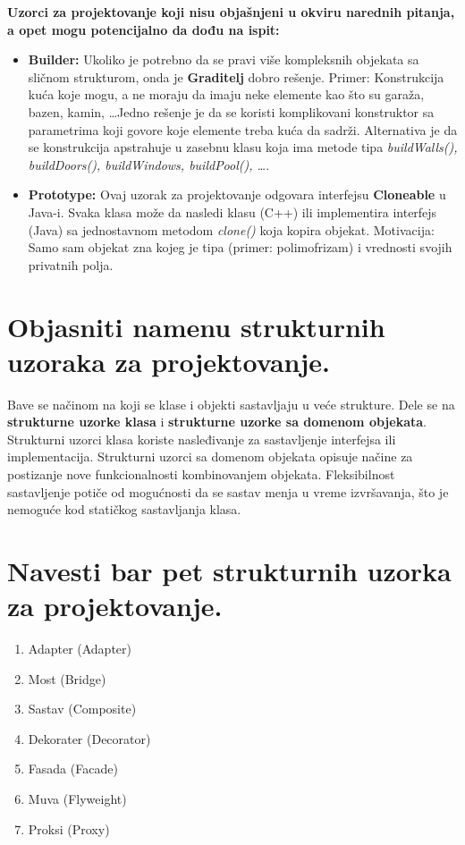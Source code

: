 \documentclass[a4paper]{article}
\begin{document}
  \textbf{Uzorci za projektovanje koji nisu objašnjeni u okviru narednih pitanja, a opet mogu potencijalno da
          dođu na ispit:}
  \begin{itemize}
    \item \textbf{Builder:} Ukoliko je potrebno da se pravi više kompleksnih objekata sa sličnom strukturom, onda je
          \textbf{Graditelj} dobro rešenje. Primer: Konstrukcija kuća koje mogu, a ne moraju da imaju neke elemente
          kao što su garaža, bazen, kamin, \dots Jedno rešenje je da se koristi komplikovani konstruktor sa parametrima
          koji govore koje elemente treba kuća da sadrži. Alternativa je da se konstrukcija apstrahuje u zasebnu klasu
          koja ima metode tipa \textit{buildWalls(), buildDoors(), buildWindows, buildPool(), \dots}.
    \item \textbf{Prototype:} Ovaj uzorak za projektovanje odgovara interfejsu \textbf{Cloneable} u Java-i. Svaka
          klasa može da nasledi klasu (C++) ili implementira interfejs (Java) sa jednostavnom metodom \textit{clone()}
          koja kopira objekat. Motivacija: Samo sam objekat zna kojeg je tipa (primer: polimofrizam) i vrednosti
          svojih privatnih polja.
  \end{itemize}

\section{Objasniti namenu strukturnih uzoraka za projektovanje.}
  Bave se načinom na koji se klase i objekti sastavljaju u veće strukture. Dele se na 
  \textbf{strukturne uzorke klasa} i \textbf{strukturne uzorke sa domenom objekata}.
  Strukturni uzorci klasa koriste nasleđivanje za sastavljenje interfejsa ili
  implementacija. Strukturni uzorci sa domenom objekata opisuje načine za postizanje nove
  funkcionalnosti kombinovanjem objekata. Fleksibilnost sastavljenje potiče od mogućnosti 
  da se sastav menja u vreme izvršavanja, što je nemoguće kod statičkog sastavljanja klasa.

\section{Navesti bar pet strukturnih uzorka za projektovanje.}
  \begin{enumerate}
    \item Adapter (Adapter)
    \item Most (Bridge)
    \item Sastav (Composite)
    \item Dekorater (Decorator)
    \item Fasada (Facade)
    \item Muva (Flyweight)
    \item Proksi (Proxy)
  \end{enumerate}
\end{document}
